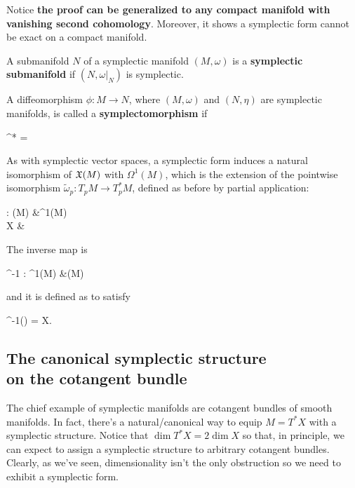 \documentclass[main.tex]{subfiles}
\begin{document}
\begin{remark}
	Notice \textbf{the proof can be generalized to any compact manifold with vanishing second cohomology}. Moreover, it shows a symplectic form cannot be exact on a compact manifold.
\end{remark}

\begin{definition}
	A submanifold $N$ of a symplectic manifold $(M, \omega)$ is a \textbf{symplectic submanifold} if $(N, \omega\vert_N)$ is symplectic.
\end{definition}
\begin{definition}
	A diffeomorphism $\phi : M \to N$, where $(M, \omega)$ and $(N, \eta)$ are symplectic manifolds, is called a \textbf{symplectomorphism} if
	\begin{eqalign}
		\phi^* \eta = \omega
	\end{eqalign}
\end{definition}

\begin{remark}
\label{rmk:inverse_ipr}
	As with symplectic vector spaces, a symplectic form induces a natural isomorphism of $\mathfrak{X}(M)$ with $\Omega^1(M)$, which is the extension of the pointwise isomorphism $\tilde\omega_p : T_pM \to T^*_pM$, defined as before by partial application:
	\begin{eqalign}
		\omega : \fields(M) &\longto \Omega^1(M)\\
				X &\longmapsto \ipr{X}\omega
	\end{eqalign}
	The inverse map is
	\begin{eqalign}
		\omega^{-1} : \Omega^1(M) &\longto \fields(M)
	\end{eqalign}
	and it is defined as to satisfy
	\begin{eqalign}
		\omega^{-1}(\omega) = X.
	\end{eqalign}
\end{remark}

\subsection[The canonical symplectic structure on the cotangent bundle]{The canonical symplectic structure\\on the cotangent bundle}
The chief example of symplectic manifolds are cotangent bundles of smooth manifolds. In fact, there's a natural/canonical way to equip $M= T^*X$ with a symplectic structure. Notice that $\dim T^*X = 2\dim X$ so that, in principle, we can expect to assign a symplectic structure to arbitrary cotangent bundles. Clearly, as we've seen, dimensionality isn't the only obstruction so we need to exhibit a symplectic form.
\end{document}
